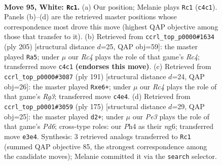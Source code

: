 \documentclass[11pt]{article}
\begin{document}
\clearpage

\begin{figure}[p]\centering
\begin{subfigure}{0.46\textwidth}\centering
\resizebox{\linewidth}{!}{%
\newchessgame
\chessboard[
  setfen={5r2/8/p2k4/P1p2p1p/1pR2P1P/4P1P1/1P4K1/8 w - - 1 95},
  showmover=false,
  pgfstyle=straightmove, color=movearrow, markmove={c4-c1}
]}
\caption{}
\end{subfigure}\hfill
\begin{subfigure}{0.46\textwidth}\centering
\resizebox{\linewidth}{!}{%
\newchessgame
\chessboard[
  setfen={8/2p5/3p2pk/2rPp1p1/1RP1P3/5P1P/5K2/8 b - - 24 103},
  showmover=false,
  pgfstyle=straightmove, color=movearrow, markmove={c5-a5}
]}
\caption{}
\end{subfigure}
\\[4pt]
\begin{subfigure}{0.46\textwidth}\centering
\resizebox{\linewidth}{!}{%
\newchessgame
\chessboard[
  setfen={4k3/4p3/p2pP1r1/P4p1p/1RP4P/4KPP1/8/8 b - - 0 96},
  showmover=false,
  pgfstyle=straightmove, color=movearrow, markmove={g6-e6}
]}
\caption{}
\end{subfigure}\hfill
\begin{subfigure}{0.46\textwidth}\centering
\resizebox{\linewidth}{!}{%
\newchessgame
\chessboard[
  setfen={6k1/6p1/6Np/p1p4P/PpP1r1P1/1P1pp3/8/2K2R2 b - - 3 88},
  showmover=false,
  pgfstyle=straightmove, color=movearrow, markmove={d3-d2}
]}
\caption{}
\end{subfigure}
\caption{\textbf{Move 95, White: \texttt{Rc1}.} (a) Our position; Melanie plays \texttt{Rc1} (\texttt{c4c1}). Panels (b)--(d) are the retrieved master positions whose correspondence most drove this move (highest QAP objective among those that transfer to it). (b) Retrieved from \texttt{ccrl\_top\_p0000\#1634} (ply 205) [structural distance $d$=25, QAP obj=59]: the master played \texttt{Ra5}; under $\mu$ our \emph{Rc4} plays the role of that game's \emph{Rc4}; transferred move \texttt{c4c1} \textbf{(endorses this move)}. (c) Retrieved from \texttt{ccrl\_top\_p0000\#3087} (ply 191) [structural distance $d$=24, QAP obj=26]: the master played \texttt{Rxe6+}; under $\mu$ our \emph{Rc4} plays the role of that game's \emph{Rg3}; transferred move \texttt{c4e4}. (d) Retrieved from \texttt{ccrl\_top\_p0001\#3059} (ply 175) [structural distance $d$=29, QAP obj=25]: the master played \texttt{d2+}; under $\mu$ our \emph{Pe3} plays the role of that game's \emph{Pd6}; cross-type roles: our \emph{P}h4 as their \emph{n}g6; transferred move \texttt{e3e4}. Synthesis: 3 retrieved analogs transferred to \texttt{Rc1} (summed QAP objective 85, the strongest correspondence among the candidate moves); Melanie committed it via the \texttt{search} selector.}
\label{fig:thought-m188}
\end{figure}
\end{document}
